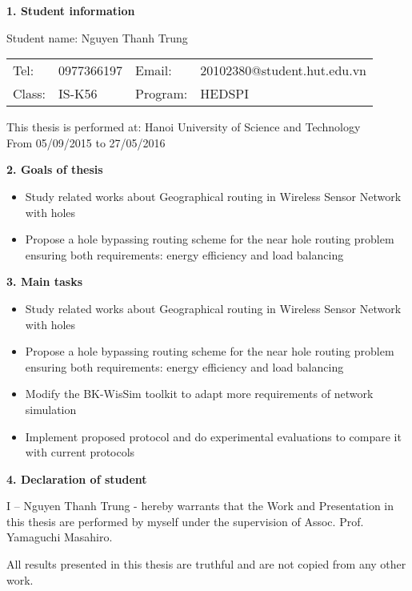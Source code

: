 \begin{acknowledgementslong}      
\textbf{1. Student information}

Student name: Nguyen Thanh Trung

\begin{tabular}{@{}l l l l}
Tel: & 0977366197 & Email: & 20102380@student.hut.edu.vn \\ 
Class: & IS-K56 & Program:  & HEDSPI
\end{tabular}

This thesis is performed at: Hanoi University of Science and Technology \\
From 05/09/2015 to 27/05/2016

\textbf{2. Goals of thesis}

\begin{itemize}
\item Study related works about Geographical routing in Wireless Sensor Network with holes
\item Propose a hole bypassing routing scheme for the near hole routing problem ensuring both requirements: energy efficiency and load balancing
\end{itemize}

\textbf{3. Main tasks}
\begin{itemize}
\item Study related works about Geographical routing in Wireless Sensor Network with holes
\item Propose a hole bypassing routing scheme for the near hole routing problem ensuring both requirements: energy efficiency and load balancing
\item Modify the BK-WisSim toolkit to adapt more requirements of network simulation
\item Implement proposed protocol and do experimental evaluations to compare it with current protocols
\end{itemize}


\textbf{4. Declaration of student}

I – Nguyen Thanh Trung - hereby warrants that the Work and Presentation in this thesis are performed by myself under the supervision of Assoc. Prof. Yamaguchi Masahiro.

All results presented in this thesis are truthful and are not copied from any other work.


\end{acknowledgementslong}
